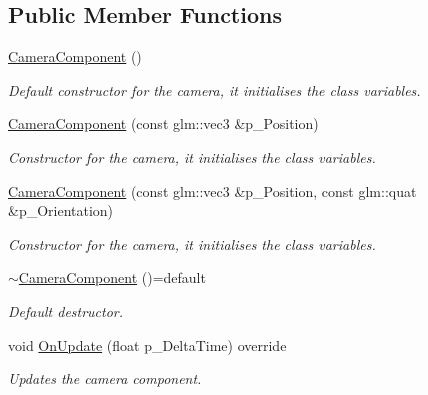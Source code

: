 \subsection*{Public Member Functions}
\begin{DoxyCompactItemize}
\item 
\mbox{\label{class_camera_component_a6f14fb3dfa5ca8cfbaae2936413837d8}} 
\mbox{\hyperlink{class_camera_component_a6f14fb3dfa5ca8cfbaae2936413837d8}{Camera\+Component}} ()
\begin{DoxyCompactList}\small\item\em Default constructor for the camera, it initialises the class\textquotesingle{} variables. \end{DoxyCompactList}\item 
\mbox{\hyperlink{class_camera_component_a0469c99fc7579c782574162032c3d7e3}{Camera\+Component}} (const glm\+::vec3 \&p\+\_\+\+Position)
\begin{DoxyCompactList}\small\item\em Constructor for the camera, it initialises the class\textquotesingle{} variables. \end{DoxyCompactList}\item 
\mbox{\hyperlink{class_camera_component_a5011cce0bdfe8ffba0e59922771f65e8}{Camera\+Component}} (const glm\+::vec3 \&p\+\_\+\+Position, const glm\+::quat \&p\+\_\+\+Orientation)
\begin{DoxyCompactList}\small\item\em Constructor for the camera, it initialises the class\textquotesingle{} variables. \end{DoxyCompactList}\item 
\mbox{\label{class_camera_component_aedbd591ad2de175b4418ddfb6f8692c6}} 
\mbox{\hyperlink{class_camera_component_aedbd591ad2de175b4418ddfb6f8692c6}{$\sim$\+Camera\+Component}} ()=default
\begin{DoxyCompactList}\small\item\em Default destructor. \end{DoxyCompactList}\item 
void \mbox{\hyperlink{class_camera_component_a8fd406e84c5c31bcdbf0ff482c76b173}{On\+Update}} (float p\+\_\+\+Delta\+Time) override
\begin{DoxyCompactList}\small\item\em Updates the camera component. \end{DoxyCompactList}\item 

\end{DoxyCompactItemize}
